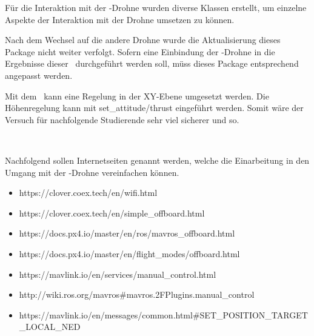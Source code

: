 





















Für die Interaktion mit der \COEX-Drohne wurden diverse Klassen erstellt, um einzelne Aspekte der Interaktion mit der Drohne umsetzen zu können.

Nach dem Wechsel auf die andere Drohne wurde die Aktualisierung dieses Package nicht weiter verfolgt. Sofern eine Einbindung der \COEX-Drohne in die Ergebnisse dieser \Arbeit\ durchgeführt werden soll, müss dieses Package entsprechend angepasst werden.




Mit dem  \missing\ kann eine Regelung in der XY-Ebene umgesetzt werden. Die Höhenregelung kann mit set\_attitude/thrust eingeführt werden.
Somit wäre der Versuch für nachfolgende Studierende sehr viel sicherer und so.


\missing\



Nachfolgend sollen Internetseiten genannt werden, welche die Einarbeitung in den Umgang mit der \COEX-Drohne vereinfachen können.

\begin{itemize}
\item https://clover.coex.tech/en/wifi.html

\item https://clover.coex.tech/en/simple\_offboard.html
\item https://docs.px4.io/master/en/ros/mavros\_offboard.html
\item https://docs.px4.io/master/en/flight\_modes/offboard.html

\item https://mavlink.io/en/services/manual\_control.html
\item http://wiki.ros.org/mavros\#mavros.2FPlugins.manual\_control

\item https://mavlink.io/en/messages/common.html\#SET\_POSITION\_TARGET\_LOCAL\_NED
\end{itemize}

